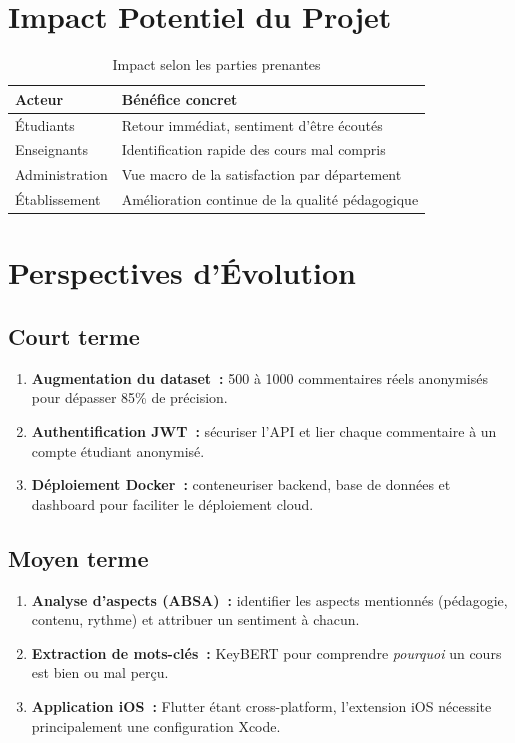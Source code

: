 \documentclass[12pt,a4paper,oneside]{report}
\begin{document}
\section{Impact Potentiel du Projet}

\begin{table}[H]
\centering
\caption{Impact selon les parties prenantes}
\label{tab:impact}
\renewcommand{\arraystretch}{1.4}
\begin{tabular}{p{3cm} p{10cm}}
\toprule
\rowcolor{bleuprincipal!15}
\textbf{Acteur} & \textbf{Bénéfice concret} \\
\midrule
Étudiants & Retour immédiat, sentiment d'être écoutés \\
\rowcolor{gray!8}
Enseignants & Identification rapide des cours mal compris \\
Administration & Vue macro de la satisfaction par département \\
\rowcolor{gray!8}
Établissement & Amélioration continue de la qualité pédagogique \\
\bottomrule
\end{tabular}
\end{table}

\section{Perspectives d'Évolution}

\subsection{Court terme}
\begin{enumerate}
  \item \textbf{Augmentation du dataset~:} 500 à 1000 commentaires réels
        anonymisés pour dépasser 85\% de précision.
  \item \textbf{Authentification JWT~:} sécuriser l'API et lier chaque
        commentaire à un compte étudiant anonymisé.
  \item \textbf{Déploiement Docker~:} conteneuriser backend, base de données
        et dashboard pour faciliter le déploiement cloud.
\end{enumerate}

\subsection{Moyen terme}
\begin{enumerate}
  \item \textbf{Analyse d'aspects (ABSA)~:} identifier les aspects mentionnés
        (pédagogie, contenu, rythme) et attribuer un sentiment à chacun.
  \item \textbf{Extraction de mots-clés~:} KeyBERT pour comprendre
        \textit{pourquoi} un cours est bien ou mal perçu.
  \item \textbf{Application iOS~:} Flutter étant cross-platform, l'extension
        iOS nécessite principalement une configuration Xcode.
\end{enumerate}
\end{document}
